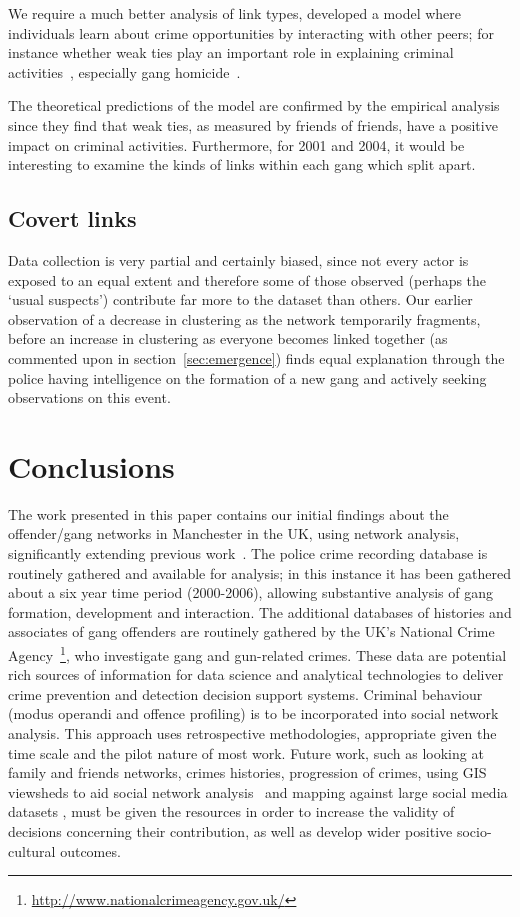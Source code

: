 \documentclass[twocolumn]{svjour3}          %
\theoremstyle{definition}
\begin{document}
We require a much better analysis of link types, developed a model
where individuals learn about crime opportunities by interacting with
other peers; for instance whether weak ties play an important role in
explaining criminal activities~\citep{PatacchiniZenou2008}, especially
gang homicide~\citep{papachristos:2009}.

The theoretical predictions of the model are confirmed by the
empirical analysis since they find that weak ties, as measured by
friends of friends, have a positive impact on criminal
activities. Furthermore, for 2001 and 2004, it would be interesting to
examine the kinds of links within each gang which split apart.

\subsection{Covert links}

Data collection is very partial and certainly biased, since not every
actor is exposed to an equal extent and therefore some of those
observed (perhaps the `usual suspects') contribute far more to the
dataset than others. Our earlier observation of a decrease in
clustering as the network temporarily fragments, before an increase in
clustering as everyone becomes linked together (as commented upon in
section~\ref{sec:emergence}) finds equal explanation through the
police having intelligence on the formation of a new gang and actively
seeking observations on this event.

\section{Conclusions}\label{sec:conclusion}

The work presented in this paper contains our initial findings about
the offender/gang networks in Manchester in the UK, using network
analysis, significantly extending previous
work~\citep{oatley+crick_asonam2014,oatley+crick_fosintsi2014}. The
police crime recording database is routinely gathered and available
for analysis; in this instance it has been gathered about a six year
time period (2000-2006), allowing substantive analysis of gang
formation, development and interaction. The additional databases of
histories and associates of gang offenders are routinely gathered by
the UK's National Crime
Agency~\footnote{\url{http://www.nationalcrimeagency.gov.uk/}}, who
investigate gang and gun-related crimes. These data are potential rich
sources of information for data science and analytical technologies to
deliver crime prevention and detection decision support
systems. Criminal behaviour (modus operandi and offence profiling) is
to be incorporated into social network analysis.  This approach uses
retrospective methodologies, appropriate given the time scale and the
pilot nature of most work. Future work, such as looking at family and
friends networks, crimes histories, progression of crimes, using GIS
viewsheds to aid social network
analysis~\citep{oatley+crick-gisruk2015} and mapping against large
social media datasets \citep{procter-et-al:2013,burnap-et-al:2014},
must be given the resources in order to increase the validity of
decisions concerning their contribution, as well as develop wider
positive socio-cultural outcomes.
\end{document}
